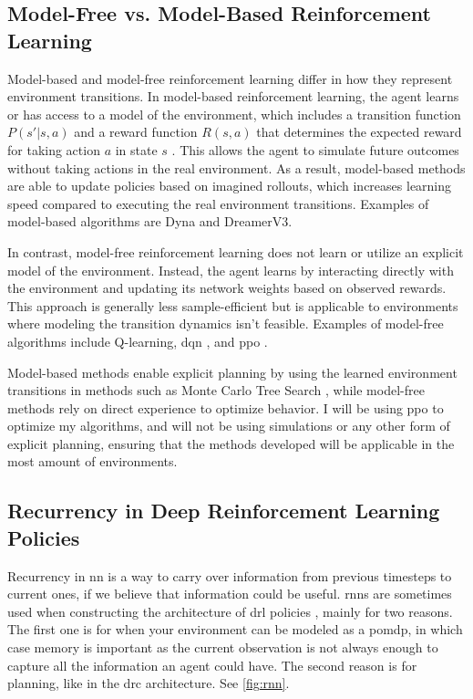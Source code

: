 \documentclass[UKenglish]{uiomasterthesis}
\begin{document}
\subsection{Model-Free vs. Model-Based Reinforcement Learning}
Model-based and model-free reinforcement learning differ in how they represent environment transitions. In model-based reinforcement learning, the agent learns or has access to a model of the environment, which includes a transition function \( P(s' | s, a) \) and a reward function \( R(s, a) \) that determines the expected reward for taking action \( a \) in state \( s \) \cite{moerland2022modelbasedreinforcementlearningsurvey}. This allows the agent to simulate future outcomes without taking actions in the real environment. As a result, model-based methods are able to update policies based on imagined rollouts, which increases learning speed compared to executing the real environment transitions. Examples of model-based algorithms are Dyna\cite{10.1145/122344.122377} and DreamerV3\cite{hafner2024masteringdiversedomainsworld}.

In contrast, model-free reinforcement learning does not learn or utilize an explicit model of the environment. Instead, the agent learns by interacting directly with the environment and updating its network weights based on observed rewards. This approach is generally less sample-efficient but is applicable to environments where modeling the transition dynamics isn't feasible. Examples of model-free algorithms include Q-learning, \ac{dqn} \cite{mnih2013playingatarideepreinforcement}, and \ac{ppo} \cite{schulman2017proximalpolicyoptimizationalgorithms}.

Model-based methods enable explicit planning by using the learned environment transitions in methods such as Monte Carlo Tree Search \cite{_wiechowski_2022}, while model-free methods rely on direct experience to optimize behavior. I will be using \ac{ppo} to optimize my algorithms, and will not be using simulations or any other form of explicit planning, ensuring that the methods developed will be applicable in the most amount of environments.

\subsection{Recurrency in Deep Reinforcement Learning Policies}
Recurrency in \ac{nn} is a way to carry over information from previous timesteps to current ones, if we believe that information could be useful. \acp{rnn} are sometimes used when constructing the architecture of \ac{drl} policies \cite{hausknecht2017deeprecurrentqlearningpartially}, mainly for two reasons. The first one is for when your environment can be modeled as a \ac{pomdp}, in which case memory is important as the current observation is not always enough to capture all the information an agent could have. The second reason is for planning, like in the \ac{drc} architecture\cite{guez2019investigationmodelfreeplanning}. See \cref{fig:rnn}.
\end{document}

